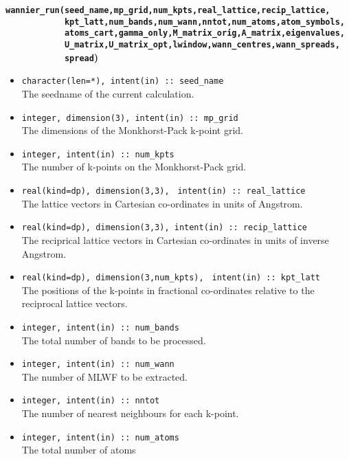 {\noindent \bf \verb#wannier_run(seed_name,mp_grid,num_kpts,real_lattice,recip_lattice,#\\
\verb#            kpt_latt,num_bands,num_wann,nntot,num_atoms,atom_symbols,#\\
\verb#            atoms_cart,gamma_only,M_matrix_orig,A_matrix,eigenvalues,#\\
\verb#            U_matrix,U_matrix_opt,lwindow,wann_centres,wann_spreads,#\\
\verb#            spread#)}

\begin{itemize}
\item \verb#character(len=*), intent(in) :: seed_name#\\ The seedname
  of the current calculation.
\item \verb#integer, dimension(3), intent(in) :: mp_grid#\\ The
  dimensions of the {Monkhorst-Pack} k-point grid.
\item \verb#integer, intent(in) :: num_kpts#\\ The number of k-points on
  the {Monkhorst-Pack} grid.
\item \verb#real(kind=dp), dimension(3,3),#
      \verb# intent(in) :: real_lattice#\\ The lattice vectors in
      Cartesian co-ordinates in units of Angstrom. 
\item \verb#real(kind=dp), dimension(3,3), intent(in) :: recip_lattice#\\
  The reciprical lattice vectors in Cartesian co-ordinates in units of inverse Angstrom.
\item \verb#real(kind=dp), dimension(3,num_kpts),#
      \verb# intent(in) :: kpt_latt#\\ The positions of the k-points in
      fractional co-ordinates relative to the reciprocal lattice
      vectors.
\item \verb#integer, intent(in) :: num_bands#\\ The total number of
      bands to be processed.
\item \verb#integer, intent(in) :: num_wann#\\ The number of MLWF to
  be extracted. 
\item \verb#integer, intent(in) :: nntot#\\ The number of
  nearest neighbours for each k-point.
\item \verb#integer, intent(in) :: num_atoms#\\ The total number of atoms

\end{itemize}
